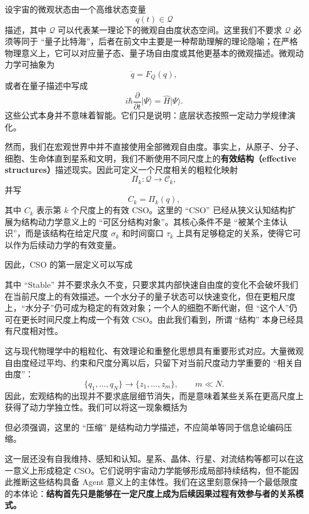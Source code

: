 设宇宙的微观状态由一个高维状态变量
\[
q(t)\in\mathcal Q
\]
描述，其中 $\mathcal Q$ 可以代表某一理论下的微观自由度状态空间。这里我们不要求 $\mathcal Q$ 必须等同于 ``量子比特海''，后者在前文中主要是一种帮助理解的理论隐喻；在严格物理意义上，它可以对应量子态、量子场自由度或其他更基本的微观描述。微观动力学可抽象为
\[
\dot q = F_Q(q),
\]
或者在量子描述中写成
\[
i\hbar\frac{\partial}{\partial t}\lvert\Psi\rangle
=
\hat H\lvert\Psi\rangle.
\]
这些公式本身并不意味着智能。它们只是说明：底层状态按照一定动力学规律演化。

然而，我们在宏观世界中并不直接使用全部微观自由度。事实上，从原子、分子、细胞、生命体直到星系和文明，我们不断使用不同尺度上的\textbf{有效结构（effective structures）}描述现实。因此可定义一个尺度相关的粗粒化映射
\[
\Pi_k:\mathcal Q\rightarrow\mathcal C_k,
\]
并写
\[
C_k=\Pi_k(q),
\]
其中 $C_k$ 表示第 $k$ 个尺度上的有效 CSO。这里的 ``CSO'' 已经从狭义认知结构扩展为结构动力学意义上的 ``可区分结构对象''。其核心条件不是 ``被某个主体认识''，而是该结构在给定尺度 $\sigma_k$ 和时间窗口 $\tau_k$ 上具有足够稳定的关系，使得它可以作为后续动力学的有效变量。

因此，CSO 的第一层定义可以写成
\begin{statementbox}
\centering
{}
\end{statementbox}
其中 ``Stable'' 并不要求永久不变，只要求其内部快速自由度的变化不会破坏我们在当前尺度上的有效描述。一个水分子的量子状态可以快速变化，但在更粗尺度上，``水分子''仍可成为稳定的有效对象；一个人的细胞不断代谢，但 ``这个人''仍可在更长时间尺度上构成一个有效 CSO。由此我们看到，所谓 ``结构'' 本身已经具有尺度相对性。

这与现代物理学中的粗粒化、有效理论和重整化思想具有重要形式对应。大量微观自由度经过平均、约束和尺度分离以后，只留下对当前尺度动力学重要的 ``相关自由度''：
\[
\{q_1,\ldots,q_N\}
\longrightarrow
\{z_1,\ldots,z_m\},
\qquad m\ll N.
\]
因此，宏观结构的出现并不要求底层细节消失，而是意味着某些关系在更高尺度上获得了动力学独立性。我们可以将这一现象概括为
\begin{statementbox}
\centering
{}
\end{statementbox}
但必须强调，这里的 ``压缩'' 是结构动力学描述，不应简单等同于信息论编码压缩。

这一层还没有自我维持、感知和认知。星系、晶体、行星、对流结构等都可以在这一意义上形成稳定 CSO。它们说明宇宙动力学能够形成局部持续结构，但不能因此推断这些结构具备 Agent 意义上的主体性。我们在这里刻意保持一个最低限度的本体论：\textbf{结构首先只是能够在一定尺度上成为后续因果过程有效参与者的关系模式。}


